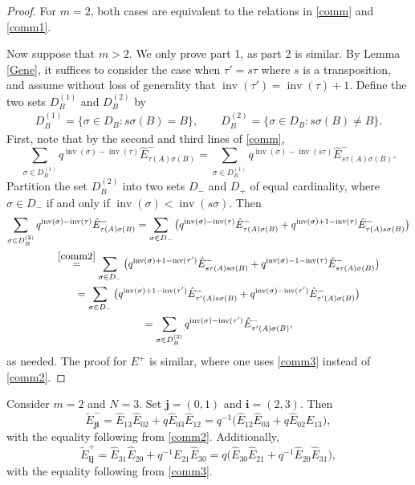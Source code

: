 \documentclass[pdftex]{sigma}
\numberwithin{equation}{section}
\DeclareMathOperator{\inv}{inv}
\newcommand{\ii}{{\mathbf{i}}}
\newcommand{\jj}{{\mathbf{j}}}
\begin{document}
\begin{proof}
	For $m=2$, both cases are equivalent to the relations in \eqref{comm} and \eqref{comm1}.
	
	Now suppose that $ m>2$. We only prove part 1, as part 2 is similar. By Lemma \ref{Gene}, it suffices to consider the case when $\tau'=s\tau$ where $s$ is a transposition, and assume without loss of generality that $\inv(\tau')= \inv(\tau)+1$. Define the two sets $D_B^{(1)}$ and $D_B^{(2)}$ by
	\begin{gather*}
		D_B^{(1)}= \{ \sigma \in D_B \colon s \sigma(B)=B \},\qquad
		D_B^{(2)}= \{ \sigma \in D_B \colon s \sigma(B) \neq B \}.
	\end{gather*}	
	First, note that by the second and third lines of \eqref{comm},
\[
	\sum_{\sigma\in D_B^{(1)}} q^{\inv(\sigma)-\inv(\tau)} \hat{E}^-_{\tau(A) \sigma (B)} = \sum_{\sigma\in D_B^{(1)}} q^{\inv(\sigma)-\inv(s\tau)} \hat{E}^-_{s \tau(A) \sigma (B)} .
\]
	Partition the set $D_B^{(2)}$ into two sets $D_-$ and $D_+$ of equal cardinality, where $\sigma \in D_-$ if and only if $\inv(\sigma) < \inv(s \sigma)$. Then
	\begin{gather*}
	\sum_{\sigma\in D_B^{(2)}} q^{\inv(\sigma)-\inv(\tau)} \hat{E}^-_{\tau(A) \sigma (B)} = \sum_{\sigma \in D_-} \big( q^{\inv(\sigma)-\inv(\tau)} \hat{E}^-_{\tau(A) \sigma (B)} + q^{\inv(\sigma)+1-\inv(\tau)} \hat{E}^-_{\tau(A) s\sigma (B)} \big) \\
\qquad \stackrel{\eqref{comm2}}{=} \sum_{\sigma \in D_-} \big( q^{\inv(\sigma)+1-\inv(\tau')} \hat{E}^-_{s\tau(A) s\sigma (B)} + q^{\inv(\sigma)-1-\inv(\tau)} \hat{E}^-_{s\tau(A) \sigma (B)} \big)\\
\qquad =\sum_{\sigma \in D_-} \big( q^{\inv(\sigma)+1-\inv(\tau')} \hat{E}^-_{\tau'(A) s\sigma (B)} + q^{\inv(\sigma)-\inv(\tau')} \hat{E}^-_{\tau'(A) \sigma (B)}\big)\\
\qquad =\sum_{\sigma\in D_B^{(2)}} q^{\inv(\sigma)-\inv(\tau')} \hat{E}^-_{\tau'(A) \sigma (B)} ,
	\end{gather*}
	as needed.
	The proof for $E^+$ is similar, where one uses \eqref{comm3} instead of \eqref{comm2}.
\end{proof}

\begin{Example}
Consider $m=2$ and $N=3$. Set $\jj=(0,1)$ and $\ii=(2,3)$. Then
\[
\tilde{E}_{\jj\ii}^- = \hat{E}_{13}\hat{E}_{02} + q \hat{E}_{03}\hat{E}_{12} = q^{-1}\big(\hat{E}_{12}\hat{E}_{03} + q \hat{E}_{02}\hat{E}_{13} \big),
\]
with the equality following from \eqref{comm2}. Additionally,
\[
\tilde{E}_{\ii\jj}^+ = \hat{E}_{31}\hat{E}_{20} + q^{-1}\hat{E}_{21}\hat{E}_{30} = q\big( \hat{E}_{30}\hat{E}_{21} + q^{-1}\hat{E}_{20}\hat{E}_{31}\big),
\]
with the equality following from \eqref{comm3}.
\end{Example}
\end{document}
